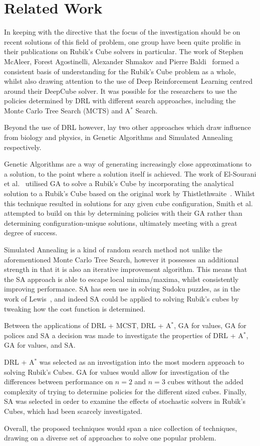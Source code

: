 \documentclass[UKenglish]{libraries/svproc}
\begin{document}
\section{Related Work}
In keeping with the directive that the focus of the investigation should be on recent solutions of this field of problem, one group have been quite prolific in their publications on Rubik's Cube solvers in particular. The work of Stephen McAleer, Forest Agostinelli, Alexander Shmakov and Pierre Baldi~\cite{mcaleer2018solving, mcaleer2019solving, agostinelli2019solving} formed a consistent basis of understanding for the Rubik's Cube problem as a whole, whilst also drawing attention to the use of Deep Reinforcement Learning centred around their DeepCube solver. It was possible for the researchers to use the policies determined by DRL with different search approaches, including the Monte Carlo Tree Search (MCTS) and A$^{\ast}$ Search.

Beyond the use of DRL however, lay two other approaches which draw influence from biology and physics, in Genetic Algorithms and Simulated Annealing respectively.

Genetic Algorithms are a way of generating increasingly close approximations to a solution, to the point where a solution itself is achieved. The work of El-Sourani et al.~\cite{10.1007/978-3-642-12239-2_9} utilised GA to solve a Rubik's Cube by incorporating the analytical solution to a Rubik's Cube based on the original work by Thistlethwaite~\cite{Thistlethwaite}. Whilst this technique resulted in solutions for any given cube configuration, Smith et al.~\cite{10.1145/2908812.2908887} attempted to build on this by determining policies with their GA rather than determining configuration-unique solutions, ultimately meeting with a great degree of success.

Simulated Annealing is a kind of random search method not unlike the aforementioned Monte Carlo Tree Search, however it possesses an additional strength in that it is also an iterative improvement algorithm. This means that the SA approach is able to escape local minima/maxima, whilst consistently improving performance. SA has seen use in solving Sudoku puzzles, as in the work of Lewis~\cite{SAarticle}, and indeed SA could be applied to solving Rubik's cubes by tweaking how the cost function is determined.

Between the applications of DRL + MCST, DRL + A$^{\ast}$, GA for values, GA for polices and SA a decision was made to investigate the properties of DRL + A$^{\ast}$, GA for values, and SA. \par DRL + A$^{\ast}$ was selected as an investigation into the most modern approach to solving Rubik's Cubes. GA for values would allow for investigation of the differences between performance on $n=2$ and $n=3$ cubes without the added complexity of trying to determine policies for the different sized cubes. Finally, SA was selected in order to examine the effects of stochastic solvers in Rubik's Cubes, which had been scarcely investigated. \par Overall, the proposed techniques would span a nice collection of techniques, drawing on a diverse set of approaches to solve one popular problem.
\end{document}
